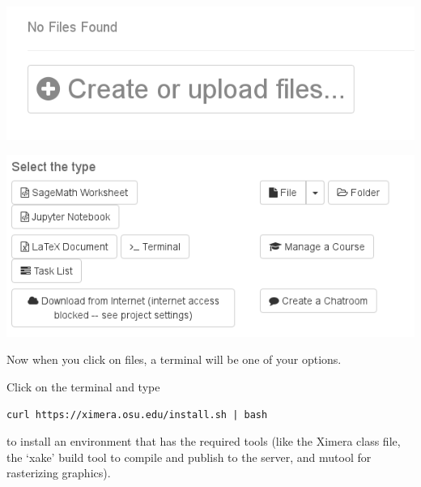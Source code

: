 \documentclass{ximera}
\begin{document}
\begin{image}
  \includegraphics{create.png}
\end{image}


\begin{image}
  \includegraphics{type.png}
\end{image}


Now when you click on files, a terminal will be one of your options.

Click on the terminal and type

\begin{verbatim}
curl https://ximera.osu.edu/install.sh | bash
\end{verbatim}
to install an environment that has the required tools (like the Ximera
class file, the `xake' build tool to compile and publish to the
server, and mutool for rasterizing graphics).
\end{document}
